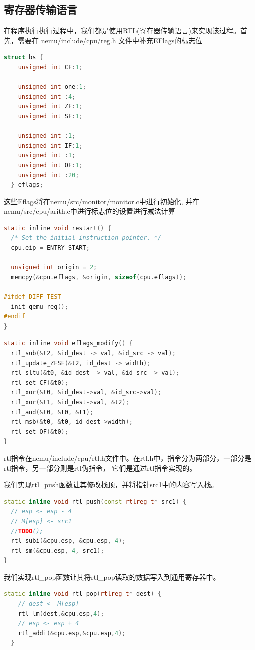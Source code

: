 \documentclass[UTF8,a4paper,10pt]{ctexart}
\begin{document}
\subsection{寄存器传输语言}
在程序执行执行过程中，我们都是使用RTL(寄存器传输语言)来实现该过程。首先，需要在 nemu/include/cpu/reg.h 文件中补充EFlags的标志位
\begin{lstlisting}[language=C]
  struct bs {
    unsigned int CF:1;

    unsigned int one:1;
    unsigned int :4;
    unsigned int ZF:1;
    unsigned int SF:1;

    unsigned int :1;
    unsigned int IF:1;
    unsigned int :1;
    unsigned int OF:1;
    unsigned int :20;
  } eflags;
\end{lstlisting}

这些Eflags将在nemu/src/monitor/monitor.c中进行初始化, 并在nemu/src/cpu/arith.c中进行标志位的设置进行减法计算
\begin{lstlisting}[language = C]
static inline void restart() {
  /* Set the initial instruction pointer. */
  cpu.eip = ENTRY_START;

  unsigned int origin = 2;
  memcpy(&cpu.eflags, &origin, sizeof(cpu.eflags));

#ifdef DIFF_TEST
  init_qemu_reg();
#endif
}
\end{lstlisting}
\begin{lstlisting}[language = C]
static inline void eflags_modify() {
  rtl_sub(&t2, &id_dest -> val, &id_src -> val);
  rtl_update_ZFSF(&t2, id_dest -> width);
  rtl_sltu(&t0, &id_dest -> val, &id_src -> val);
  rtl_set_CF(&t0);
  rtl_xor(&t0, &id_dest->val, &id_src->val);
  rtl_xor(&t1, &id_dest->val, &t2);
  rtl_and(&t0, &t0, &t1);
  rtl_msb(&t0, &t0, id_dest->width);
  rtl_set_OF(&t0);
}
\end{lstlisting}

rtl指令在nemu/include/cpu/rtl.h文件中。在rtl.h中，指令分为两部分，一部分是rtl指令，另一部分则是rtl伪指令， 它们是通过rtl指令实现的。

我们实现rtl\_push函数让其修改栈顶，并将指针src1中的内容写入栈。
\begin{lstlisting}[language = C++]
static inline void rtl_push(const rtlreg_t* src1) {
  // esp <- esp - 4
  // M[esp] <- src1
  //TODO();
  rtl_subi(&cpu.esp, &cpu.esp, 4);
  rtl_sm(&cpu.esp, 4, src1);
}
\end{lstlisting}

我们实现rtl\_pop函数让其将rtl\_pop读取的数据写入到通用寄存器中。
\begin{lstlisting}[language = C++]
static inline void rtl_pop(rtlreg_t* dest) {
    // dest <- M[esp]
    rtl_lm(dest,&cpu.esp,4);
    // esp <- esp + 4
    rtl_addi(&cpu.esp,&cpu.esp,4);
  }
\end{lstlisting}
\end{document}
